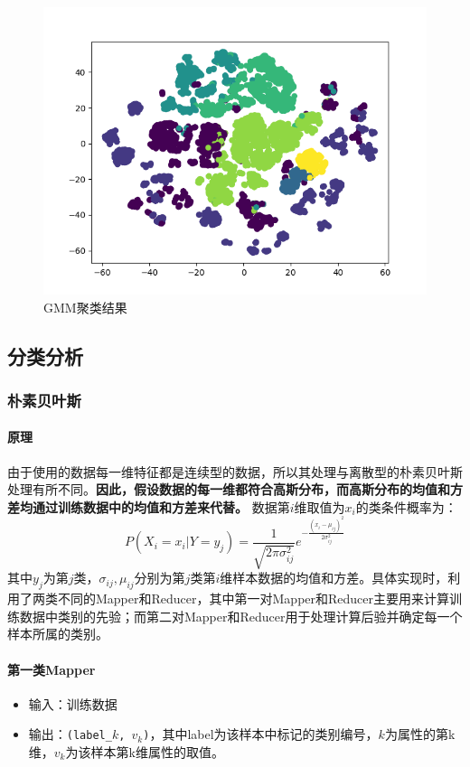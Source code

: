 \documentclass{ML}
\begin{document}
\begin{figure}[hbt]
    \centering
    \includegraphics[width=0.8\linewidth]{media/GMM.png}    
    \caption{GMM聚类结果}\label{fig:gmm}
\end{figure}
\subsection{分类分析}
\subsubsection{朴素贝叶斯}
\paragraph{原理}
由于使用的数据每一维特征都是连续型的数据，所以其处理与离散型的朴素贝叶斯处理有所不同。\textbf{因此，假设数据的每一维都符合高斯分布，而高斯分布的均值和方差均通过训练数据中的均值和方差来代替。}
数据第$i$维取值为$x_i$的类条件概率为：
$$
    P(X_i = x_i | Y = y_j) = \dfrac{1}{\sqrt{2\pi\sigma_{ij}^2}}e^{-\frac{(x_i - \mu_{ij})^2}{2\sigma_{ij}^2}}
$$
其中$y_j$为第$j$类，$\sigma_{ij}, \mu_{ij}$分别为第$j$类第$i$维样本数据的均值和方差。具体实现时，利用了两类不同的Mapper和Reducer，其中第一对Mapper和Reducer主要用来计算训练数据中类别的先验；而第二对Mapper和Reducer用于处理计算后验并确定每一个样本所属的类别。

\paragraph{第一类Mapper}
\begin{itemize}
    \item 输入：训练数据
    \item 输出：\texttt{(label\_$k$, $v_k$)}，其中label为该样本中标记的类别编号，$k$为属性的第k维，$v_k$为该样本第k维属性的取值。
\end{itemize}
\end{document}
